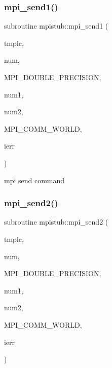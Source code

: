 \subsubsection{\texorpdfstring{mpi\_send1()}{mpi\_send1()}}
{\footnotesize\ttfamily subroutine mpistub\+::mpi\+\_\+send1 (\begin{DoxyParamCaption}\item[{double precision, dimension(\+:)}]{tmplc,  }\item[{}]{num,  }\item[{}]{M\+P\+I\+\_\+\+D\+O\+U\+B\+L\+E\+\_\+\+P\+R\+E\+C\+I\+S\+I\+ON,  }\item[{}]{num1,  }\item[{}]{num2,  }\item[{}]{M\+P\+I\+\_\+\+C\+O\+M\+M\+\_\+\+W\+O\+R\+LD,  }\item[{}]{ierr }\end{DoxyParamCaption})}



mpi send command 

\mbox{\label{namespacempistub_a6c4e68898245f7cb86fa2854a852a0e4}} 
\subsubsection{\texorpdfstring{mpi\_send2()}{mpi\_send2()}}
{\footnotesize\ttfamily subroutine mpistub\+::mpi\+\_\+send2 (\begin{DoxyParamCaption}\item[{double precision}]{tmplc,  }\item[{}]{num,  }\item[{}]{M\+P\+I\+\_\+\+D\+O\+U\+B\+L\+E\+\_\+\+P\+R\+E\+C\+I\+S\+I\+ON,  }\item[{}]{num1,  }\item[{}]{num2,  }\item[{}]{M\+P\+I\+\_\+\+C\+O\+M\+M\+\_\+\+W\+O\+R\+LD,  }\item[{}]{ierr }\end{DoxyParamCaption})}

\mbox{\label{namespacempistub_aa2236bd3615856981e15e75fd85bce13}} 
